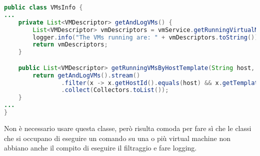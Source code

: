 \begin{lstlisting}[language=Java, label=code:VMsInfoFilter, caption=VMsInfo logging e filtro, xleftmargin=1em, basicstyle=\fontsize{9}{10}\ttfamily]
public class VMsInfo {
...
    private List<VMDescriptor> getAndLogVMs() {
        List<VMDescriptor> vmDescriptors = vmService.getRunningVirtualMachineInfo();
        logger.info("The VMs running are: " + vmDescriptors.toString());
        return vmDescriptors;
    }

    public List<VMDescriptor> getRunningVMsByHostTemplate(String host, String templateId) {
        return getAndLogVMs().stream()
                .filter(x -> x.getHostId().equals(host) && x.getTemplateId().equals(templateId))
        		.collect(Collectors.toList());
    }
...
}
\end{lstlisting}
Non è necessario usare questa classe, però risulta comoda per fare sì che le classi che si occupano di eseguire un comando su una o più virtual machine non abbiano anche il compito di eseguire il filtraggio e fare logging.

